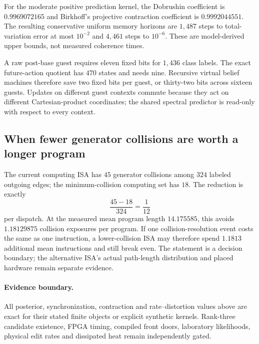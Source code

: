 For the moderate positive prediction kernel, the Dobrushin coefficient is
$0.9969072165$ and Birkhoff's projective contraction coefficient is $0.9992044551$.
The resulting conservative uniform memory horizons are $1{,}487$ steps to total-variation
error at most $10^{-2}$ and $4{,}461$ steps to $10^{-6}$.  These are model-derived upper
bounds, not measured coherence times.

A raw post-base guest requires eleven fixed bits for $1{,}436$ class labels.  The exact
future-action quotient has $470$ states and needs nine.  Recursive virtual belief machines
therefore save two fixed bits per guest, or thirty-two bits across sixteen guests.  Updates
on different guest contexts commute because they act on different Cartesian-product
coordinates; the shared spectral predictor is read-only with respect to every context.

\subsection{When fewer generator collisions are worth a longer program}

The current computing ISA has $45$ generator collisions among $324$ labeled outgoing
edges; the minimum-collision computing set has $18$.  The reduction is exactly
\[
 \frac{45-18}{324}=\frac1{12}
\]
per dispatch.  At the measured mean program length $14.175585$, this avoids
$1.18129875$ collision exposures per program.  If one collision-resolution event costs the
same as one instruction, a lower-collision ISA may therefore spend $1.1813$ additional mean
instructions and still break even.  The statement is a decision boundary; the alternative
ISA's actual path-length distribution and placed hardware remain separate evidence.

\paragraph{Evidence boundary.}
All posterior, synchronization, contraction and rate--distortion values above are exact
for their stated finite objects or explicit synthetic kernels.  Rank-three candidate
existence, FPGA timing, compiled front doors, laboratory likelihoods, physical edit rates
and dissipated heat remain independently gated.
